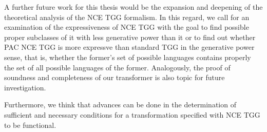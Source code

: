 A further future work for this thesis would be the expansion and deepening of the theoretical analysis of the NCE TGG formalism. In this regard, we call for an examination of the expressiveness of NCE TGG with the goal to find possible proper subclasses of it with less generative power than it or to find out whether PAC NCE TGG is more expressve than standard TGG in the generative power sense, that is, whether the former's set of possible languages contains properly the set of all possible languages of the former. Analogously, the proof of soundness and completeness of our transformer is also topic for future investigation.

Furthermore, we think that advances can be done in the determination of sufficient and necessary conditions for a transformation specified with NCE TGG to be functional.








